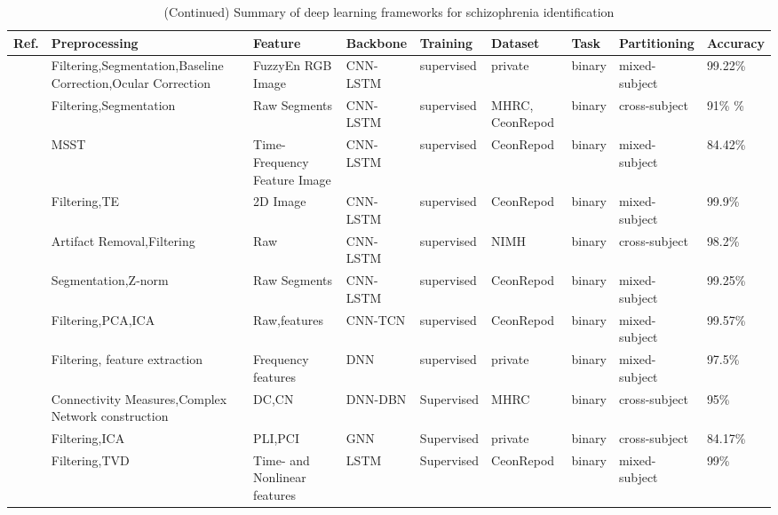 \begin{table*}[ht]
\renewcommand{\arraystretch}{1.2}
\caption*{(Continued) Summary of deep learning frameworks for schizophrenia identification}
\footnotesize
\begin{tabular}{p{0.4cm}p{2.8cm}p{2cm}p{1.5cm}p{1.9cm}p{1.9cm}p{0.8cm}p{1.8cm}p{2cm}}
\hline
\textbf{Ref.} & \textbf{Preprocessing} & \textbf{Feature} & \textbf{Backbone} & \textbf{Training} & \textbf{Dataset} & \textbf{Task} & \textbf{Partitioning} & \textbf{Accuracy} \\
\hline
~\cite{sun2021hybrid} & Filtering,Segmentation,\newline Baseline Correction,\newline Ocular Correction & FuzzyEn RGB Image & CNN-LSTM & supervised & private & binary & mixed-subject & 99.22\% \\
~\cite{SZ36} & Filtering,Segmentation & Raw Segments & CNN-LSTM & supervised & MHRC, \newline CeonRepod & binary & cross-subject & 91\% \newline 96.1\% \\
~\cite{SZ37} & MSST & Time-Frequency Feature Image & CNN-LSTM & supervised & CeonRepod & binary & mixed-subject & 84.42\% \\
~\cite{SZ38} & Filtering,TE & 2D Image & CNN-LSTM & supervised & CeonRepod & binary & mixed-subject & 99.9\% \\
~\cite{SZ39} & Artifact Removal,\newline Filtering & Raw & CNN-LSTM & supervised & NIMH & binary & cross-subject & 98.2\% \\
~\cite{SZ40} & Segmentation,Z-norm & Raw Segments & CNN-LSTM & supervised & CeonRepod & binary & mixed-subject & 99.25\% \\
~\cite{SZ41} & Filtering,PCA,ICA & Raw,features & CNN-TCN & supervised & CeonRepod & binary & mixed-subject & 99.57\% \\
~\cite{SZ42} & Filtering, feature extraction & Frequency features & DNN & supervised & private & binary & mixed-subject & 97.5\% \\
~\cite{SZ43} & Connectivity Measures,Complex Network construction & DC,CN & DNN-DBN & Supervised & MHRC & binary & cross-subject & 95\% \\
~\cite{SZ44} & Filtering,ICA & PLI,PCI & GNN & Supervised & private & binary & cross-subject & 84.17\% \\
~\cite{SZ45} & Filtering,TVD & Time- and Nonlinear features & LSTM & Supervised & CeonRepod & binary & mixed-subject & 99\% \\

\end{tabular}
\end{table*}
